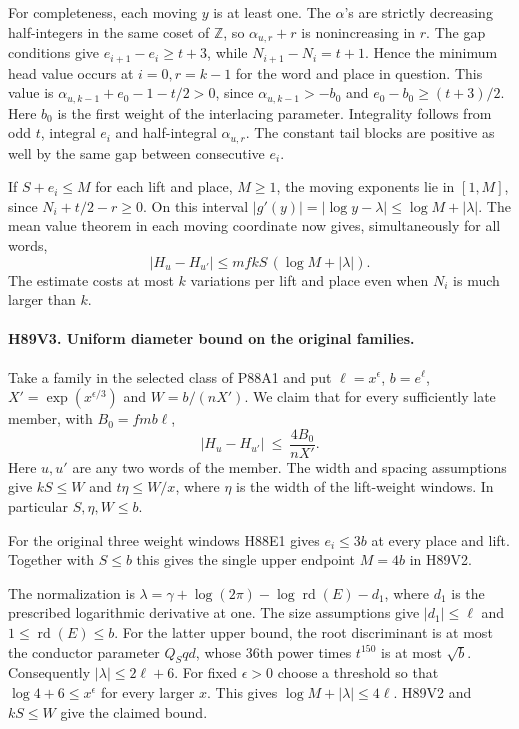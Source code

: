 For completeness, each moving $y$ is at least one. The
$\alpha$'s are strictly decreasing half-integers in the same
coset of $\mathbb Z$, so $\alpha_{u,r}+r$ is nonincreasing in
$r$. The gap conditions give $e_{i+1}-e_i\ge t+3$, while
$N_{i+1}-N_i=t+1$. Hence the minimum head value occurs at
$i=0,r=k-1$ for the word and place in question. This value is
$\alpha_{u,k-1}+e_0-1-t/2>0$, since $\alpha_{u,k-1}>-b_0$
and $e_0-b_0\ge(t+3)/2$. Here $b_0$ is the first weight of the
interlacing parameter. Integrality follows from odd $t$, integral
$e_i$ and half-integral $\alpha_{u,r}$. The constant tail blocks
are positive as well by the same gap between consecutive $e_i$.

If $S+e_i\le M$ for each lift and place, $M\ge1$, the
moving exponents lie in $[1,M]$, since $N_i+t/2-r\ge0$.
On this interval $|g'(y)|=|\log y-\lambda|
\le\log M+|\lambda|$. The mean value theorem in each moving
coordinate now gives, simultaneously for all words,
\[
            |H_u-H_{u'}|\le mfkS\,(\log M+|\lambda|).
\]
The estimate costs at most $k$ variations per lift and place
even when $N_i$ is much larger than $k$.

\paragraph{H89V3. Uniform diameter bound on the original families.}
Take a family in the selected class of P88A1 and put $\ell=x^\epsilon$, $b=e^\ell$, $X'=\exp(x^{\epsilon/3})$
and $W=b/(nX')$. We claim that for every sufficiently
late member, with $B_0=fmb\ell$,
\[
       |H_u-H_{u'}|\ \le\ \frac{4B_0}{nX'} .
\]
Here $u,u'$ are any two words of the member. The width and spacing assumptions
give $kS\le W$ and $t\eta\le W/x$, where $\eta$ is the width
of the lift-weight windows. In particular $S,\eta,W\le b$.

For the original three weight windows H88E1 gives $e_i\le3b$
at every place and lift. Together with $S\le b$ this gives the
single upper endpoint $M=4b$ in H89V2.

The normalization is
$\lambda=\gamma+\log(2\pi)-\log\operatorname{rd}(E)-d_1$,
where $d_1$ is the prescribed logarithmic derivative at one.
The size assumptions give $|d_1|\le\ell$ and
$1\le\operatorname{rd}(E)\le b$. For the latter upper bound,
the root discriminant is at most the conductor parameter
$Q_S qd$, whose $36$th power times $t^{150}$ is at most
$\sqrt b$. Consequently $|\lambda|\le 2\ell+6$.
For fixed $\epsilon>0$ choose a threshold so that
$\log 4+6\le x^\epsilon$ for every larger $x$. This gives
$\log M+|\lambda|\le4\ell$. H89V2 and $kS\le W$ give the
claimed bound.

